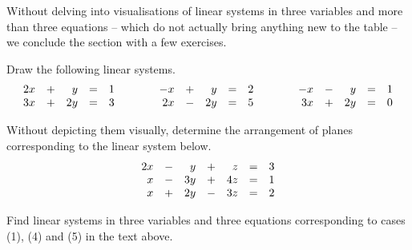 Without delving into visualisations of linear systems in three variables and
more than three equations -- which do not actually bring anything new to the
table -- we conclude the section with a few exercises.

\begin{exercise}{}{}
 Draw the following linear systems.
 \[
  \begin{array}{r c r c r}
   2x & + & y & = & 1\\
   3x & + & 2y & = & 3
  \end{array}
  \hspace{3em}
  \begin{array}{r c r c r}
   -x & + & y & = & 2\\
   2x & - & 2y & = & 5
  \end{array}
  \hspace{3em}
  \begin{array}{r c r c r}
   -x & - & y & = & 1\\
   3x & + & 2y & = & 0
  \end{array}
 \]
\end{exercise}

\begin{exercise}{}{}
 Without depicting them visually, determine the arrangement of planes
 corresponding to the linear system below.
 \[
  \begin{array}{r c r c r c r}
   2x & - & y & + & z & = & 3\\
   x & - & 3y & + & 4z & = & 1\\
   x & + & 2y & - & 3z & = & 2
  \end{array}
 \]
\end{exercise}

\begin{exercise}{}{}
 Find linear systems in three variables and three equations corresponding to
 cases (1), (4) and (5) in the text above.
\end{exercise}
